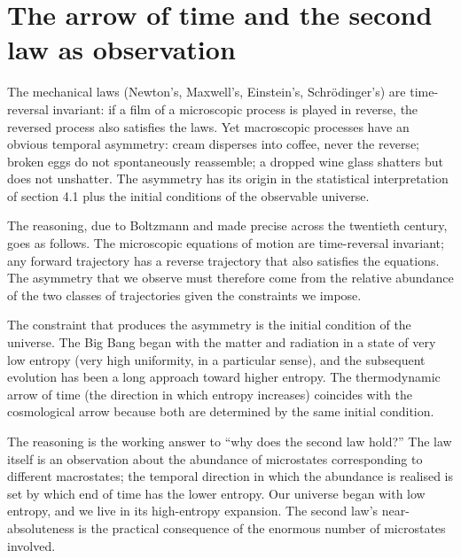 \section{The arrow of time and the second law as observation}

The mechanical laws (Newton's, Maxwell's, Einstein's, Schr\"odinger's)
are time-reversal invariant: if a film of a microscopic process is
played in reverse, the reversed process also satisfies the laws. Yet
macroscopic processes have an obvious temporal asymmetry: cream
disperses into coffee, never the reverse; broken eggs do not
spontaneously reassemble; a dropped wine glass shatters but does not
unshatter. The asymmetry has its origin in the statistical
interpretation of section 4.1 plus the initial conditions of the
observable universe.

The reasoning, due to Boltzmann and made precise across the twentieth
century, goes as follows. The microscopic equations of motion are
time-reversal invariant; any forward trajectory has a reverse
trajectory that also satisfies the equations. The asymmetry that we
observe must therefore come from the relative abundance of the two
classes of trajectories given the constraints we impose.

The constraint that produces the asymmetry is the initial condition
of the universe. The Big Bang began with the matter and radiation in
a state of very low entropy (very high uniformity, in a particular
sense), and the subsequent evolution has been a long approach toward
higher entropy. The thermodynamic arrow of time (the direction in
which entropy increases) coincides with the cosmological arrow
because both are determined by the same initial condition.

The reasoning is the working answer to ``why does the second law
hold?'' The law itself is an observation about the abundance of
microstates corresponding to different macrostates; the temporal
direction in which the abundance is realised is set by which end of
time has the lower entropy. Our universe began with low entropy, and
we live in its high-entropy expansion. The second law's
near-absoluteness is the practical consequence of the enormous
number of microstates involved.

